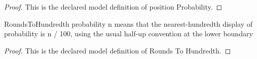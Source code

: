 \begin{proof}
  This is the declared model definition of position Probability.
\end{proof}
\begin{definition}
  \label{def:physics:phyx-mini-0506:phyxmini0506-roundstohundredth}
  RoundsToHundredth probability n means that the nearest-hundredth display of probability is n / 100, using the usual half-up convention at the lower boundary
\end{definition}
\begin{proof}
  This is the declared model definition of Rounds To Hundredth.
\end{proof}
